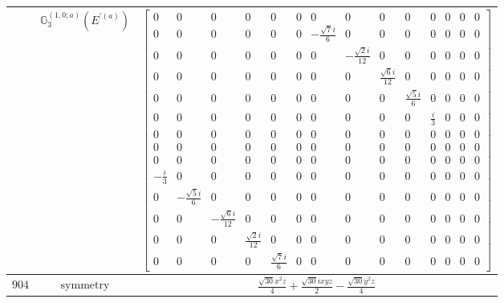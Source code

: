 \documentclass[fleqn,8pt,landscape]{jsarticle}
\begin{document}
\begin{longtable}{ccc}
$  $ & $ \mathbb{G}_{3}^{(1,0;a)}(E^{\prime(a)}) $ & $ \begin{bmatrix} 0 & 0 & 0 & 0 & 0 & 0 & 0 & 0 & 0 & 0 & 0 & 0 & 0 & 0 \\ 0 & 0 & 0 & 0 & 0 & 0 & - \frac{\sqrt{7} i}{6} & 0 & 0 & 0 & 0 & 0 & 0 & 0 \\ 0 & 0 & 0 & 0 & 0 & 0 & 0 & - \frac{\sqrt{2} i}{12} & 0 & 0 & 0 & 0 & 0 & 0 \\ 0 & 0 & 0 & 0 & 0 & 0 & 0 & 0 & \frac{\sqrt{6} i}{12} & 0 & 0 & 0 & 0 & 0 \\ 0 & 0 & 0 & 0 & 0 & 0 & 0 & 0 & 0 & \frac{\sqrt{5} i}{6} & 0 & 0 & 0 & 0 \\ 0 & 0 & 0 & 0 & 0 & 0 & 0 & 0 & 0 & 0 & \frac{i}{3} & 0 & 0 & 0 \\ 0 & 0 & 0 & 0 & 0 & 0 & 0 & 0 & 0 & 0 & 0 & 0 & 0 & 0 \\ 0 & 0 & 0 & 0 & 0 & 0 & 0 & 0 & 0 & 0 & 0 & 0 & 0 & 0 \\ 0 & 0 & 0 & 0 & 0 & 0 & 0 & 0 & 0 & 0 & 0 & 0 & 0 & 0 \\ - \frac{i}{3} & 0 & 0 & 0 & 0 & 0 & 0 & 0 & 0 & 0 & 0 & 0 & 0 & 0 \\ 0 & - \frac{\sqrt{5} i}{6} & 0 & 0 & 0 & 0 & 0 & 0 & 0 & 0 & 0 & 0 & 0 & 0 \\ 0 & 0 & - \frac{\sqrt{6} i}{12} & 0 & 0 & 0 & 0 & 0 & 0 & 0 & 0 & 0 & 0 & 0 \\ 0 & 0 & 0 & \frac{\sqrt{2} i}{12} & 0 & 0 & 0 & 0 & 0 & 0 & 0 & 0 & 0 & 0 \\ 0 & 0 & 0 & 0 & \frac{\sqrt{7} i}{6} & 0 & 0 & 0 & 0 & 0 & 0 & 0 & 0 & 0 \end{bmatrix} $ \\ \hline
$ 904 $ & $ \text{symmetry} $ & $ \frac{\sqrt{30} x^{2} z}{4} + \frac{\sqrt{30} i x y z}{2} - \frac{\sqrt{30} y^{2} z}{4} $ \\

\end{longtable}
\end{document}
